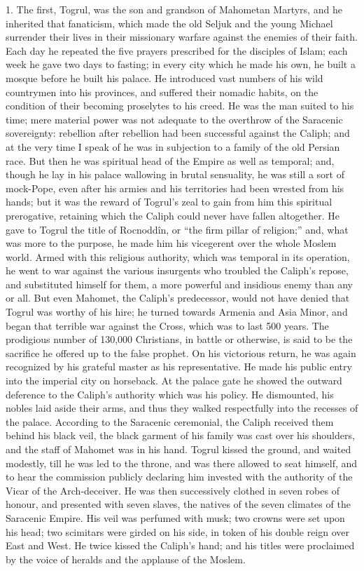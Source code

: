 1. The first, Togrul, was the
son and grandson of Mahometan Martyrs, and he inherited that
fanaticism, which made the old Seljuk and the young Michael surrender
their lives in their missionary warfare against the enemies of their
faith. Each day he repeated the five prayers prescribed for the
disciples of Islam; each week he gave two days to fasting; in every
city which he made his own, he built a mosque before he built his
palace. He introduced vast numbers of his wild countrymen into his
provinces, and suffered their nomadic habits, on the condition of
their becoming proselytes to his creed. He was the man suited to his
time; mere material power was not adequate to the overthrow of the
Saracenic sovereignty: rebellion after rebellion had been successful
against the Caliph; and at the very time I speak of he was in
subjection to a family of the old Persian race. But then he was
spiritual head of the Empire as well as temporal; and, though he lay
in his palace wallowing in brutal sensuality, he was still a sort of
mock-Pope, even after his armies and his territories had been wrested
from his hands; but it was the reward of Togrul's zeal to gain from
him this spiritual prerogative, retaining which the Caliph could never
have fallen altogether. He gave to Togrul the title of Rocnoddîn, or ``the
firm pillar of religion;'' and, what was more to the purpose, he made
him his vicegerent over the whole Moslem world. Armed with this
religious authority, which was temporal in its operation, he went to
war against the various insurgents who troubled the Caliph's repose,
and substituted himself for them, a more powerful and insidious enemy
than any or all. But even Mahomet, the Caliph's predecessor, would not
have denied that Togrul was worthy of his hire; he turned towards
Armenia and Asia Minor, and began that terrible war against the Cross,
which was to last 500 years. The prodigious number of 130,000
Christians, in battle or otherwise, is said to be the sacrifice he
offered up to the false prophet. On his victorious return, he was
again recognized by his grateful master as his representative. He made
his public entry into the imperial city on horseback. At the palace
gate he showed the outward deference to the Caliph's authority which
was his policy. He dismounted, his nobles laid aside their arms, and
thus they walked respectfully into the recesses of the palace.
According to the Saracenic ceremonial, the Caliph received them behind
his black veil, the black garment of his family was cast over his
shoulders, and the staff of Mahomet was in his hand. Togrul kissed the
ground, and waited modestly, till he was led to the throne, and was
there allowed to seat himself, and to hear the commission publicly
declaring him invested with the authority of the Vicar of the
Arch-deceiver. He was then successively clothed in seven robes of
honour, and presented with seven slaves, the natives of the seven
climates of the Saracenic Empire. His veil was perfumed with musk; two
crowns were set upon his head; two scimitars were girded on his side,
in token of his double reign over East and West. He twice kissed the
Caliph's hand; and his titles were proclaimed by the voice of heralds
and the applause of the Moslem.

